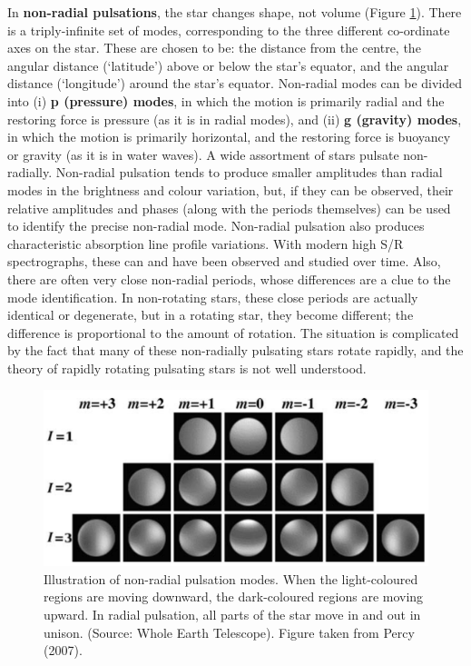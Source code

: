 \documentclass[a4paper,10pt]{article}
\begin{document}
{\noindent}In \textbf{non-radial pulsations}, the star changes shape, not volume (Figure \ref{fig:nonradialpulsations}). There is a triply-infinite set of modes, corresponding to the three different co-ordinate axes on the star. These are chosen to be: the distance from the centre, the angular distance (`latitude') above or below the star's equator, and the angular distance (`longitude') around the star's equator. Non-radial modes can be divided into (i) \textbf{p (pressure) modes}, in which the motion is primarily radial and the restoring force is pressure (as it is in radial modes), and (ii) \textbf{g (gravity) modes}, in which the motion is primarily horizontal, and the restoring force is buoyancy or gravity (as it is in water waves). A wide assortment of stars pulsate non-radially. Non-radial pulsation tends to produce smaller amplitudes than radial modes in the brightness and colour variation, but, if they can be observed, their relative amplitudes and phases (along with the periods themselves) can be used to identify the precise non-radial mode. Non-radial pulsation also produces characteristic absorption line profile variations. With modern high S/R spectrographs, these can and have been observed and studied over time. Also, there are often very close non-radial periods, whose differences are a clue to the mode identification. In non-rotating stars, these close periods are actually identical or degenerate, but in a rotating star, they become different; the difference is proportional to the amount of rotation. The situation is complicated by the fact that many of these non-radially pulsating stars rotate rapidly, and the theory of rapidly rotating pulsating stars is not well understood.

\begin{figure}[t]
    \centering
    \includegraphics[width=14cm]{figures/NonradialPulsations.png}
    \caption{\footnotesize{Illustration of non-radial pulsation modes. When the light-coloured regions are moving downward, the dark-coloured regions are moving upward. In radial pulsation, all parts of the star move in and out in unison. (Source: Whole Earth Telescope). Figure taken from Percy (2007).}}
    \label{fig:nonradialpulsations}
\end{figure}
\end{document}
